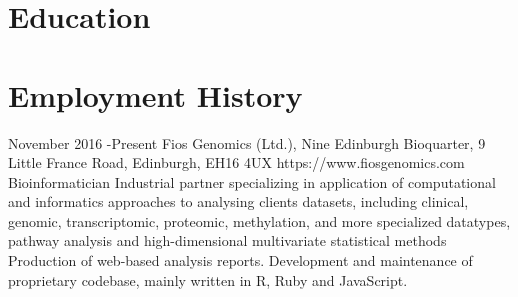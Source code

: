 \documentclass[10pt]{article} %
\begin{document}

\section{Education}







\section{Employment History}

\job
{November 2016 -}{Present}
{Fios Genomics (Ltd.), Nine Edinburgh Bioquarter, 9 Little France Road,  Edinburgh, EH16 4UX}
{https://www.fiosgenomics.com}
{Bioinformatician}
{Industrial partner specializing in application of computational and informatics approaches to analysing clients datasets, including clinical, genomic, transcriptomic, proteomic, methylation, and more specialized datatypes, pathway analysis and high-dimensional multivariate statistical methods
Production of web-based analysis reports.
Development and maintenance of proprietary codebase, mainly written in R, Ruby and JavaScript. \\}
\end{document}
